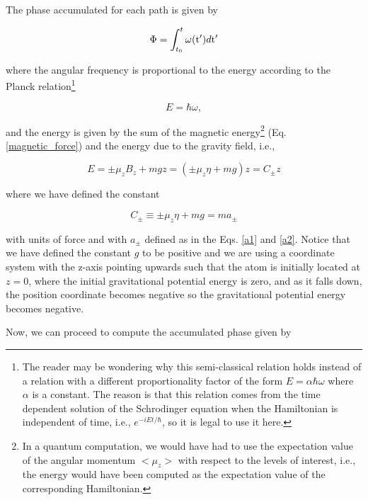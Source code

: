\documentclass{article}
\begin{document}
The phase accumulated for each path is given by

\begin{equation}
\Phi = \int_{t_{0}}^{t} \omega(\ce{^{}_{}t{'}_{}})d\ce{^{}_{}t{'}_{}}
\end{equation}

where the angular frequency is proportional to the energy according to the Planck relation\footnote{The reader may be wondering why this semi-classical relation holds instead of a relation with a different proportionality factor of the form $E = \alpha \hbar \omega$ where $\alpha$ is a constant. The reason is that this relation comes from the time dependent solution of the Schrodinger equation when the Hamiltonian is independent of time, i.e., $e^{-i E t/\hbar}$, so it is legal to use it here.}

\begin{equation}\label{planck_relation}
E = \hbar \omega, 
\end{equation}

and the energy is given by the sum of the magnetic energy\footnote{In a quantum computation, we would have had to use the expectation value of the angular momentum $<\mu_{z}>$ with respect to the levels of interest, i.e., the energy would have been computed as the expectation value of the corresponding Hamiltonian.} (Eq. \ref{magnetic_force}) and the energy due to the gravity field, i.e.,

\begin{equation}\label{classic_energy}
E = \pm \mu_{z} B_{z} + mgz = (\pm \mu_{z} \eta + mg)z = C_{\pm} z
\end{equation}

where we have defined the constant

\begin{equation}\label{c_definition}
C_{\pm} \equiv \pm \mu_{z} \eta + mg = m a_{\pm}
\end{equation}

with units of force and with $a_{\pm}$ defined as in the Eqs. \ref{a1} and \ref{a2}. Notice that we have defined the constant $g$ to be positive and we are using a coordinate system with the z-axis pointing upwards such that the atom is initially located at $z=0$, where the initial gravitational potential energy is zero, and as it falls down, the position coordinate becomes negative so the gravitational potential energy becomes negative.

Now, we can proceed to compute the accumulated phase given by
\end{document}
